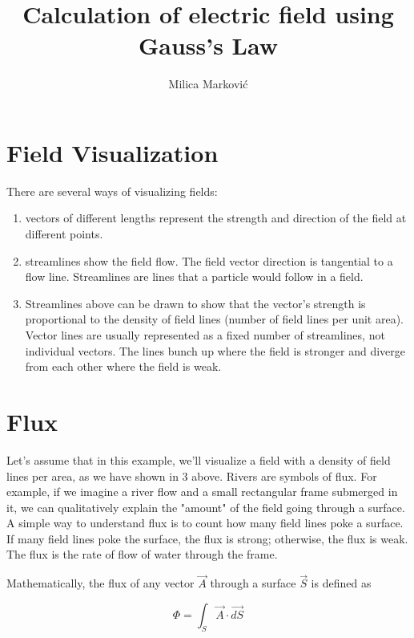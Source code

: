 \documentclass{ximera}
\title{Calculation of electric field using Gauss's Law}
\author{Milica Markovi\'c}
\begin{document}
  
\begin{abstract}  

\end{abstract}  
\maketitle    




\section{Field Visualization}

There are several ways of visualizing fields:
\begin{enumerate}
\item vectors of different lengths represent the strength and direction of the field at different points. 
\item streamlines show the field flow. The field vector direction is tangential to a flow line. Streamlines are lines that a particle would follow in a field.
\item Streamlines above can be drawn to show that the vector's strength is proportional to the density of field lines (number of field lines per unit area). Vector lines are usually represented as a fixed number of streamlines, not individual vectors. The lines bunch up where the field is stronger and diverge from each other where the field is weak.
\end{enumerate}

\section{Flux}

Let's assume that in this example, we'll visualize a field with a density of field lines per area, as we have shown in 3 above.  Rivers are symbols of flux. For example, if we imagine a river flow and a small rectangular frame submerged in it, we can qualitatively explain the "amount" of the field going through a surface.  A simple way to understand flux is to count how many field lines poke a surface.  If many field lines poke the surface, the flux is strong; otherwise, the flux is weak. The flux is the rate of flow of water through the frame.  


Mathematically, the flux of any vector $\vec{A}$ through a surface $\vec{S}$ is defined as

\begin{equation}
\Phi=\int_S \vec{A} \cdot \vec{dS}
\end{equation}
\end{document}
